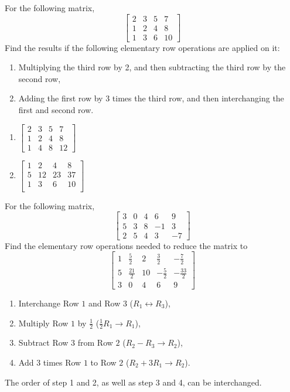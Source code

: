 \begin{Exercise}
For the following matrix,
\[
\begin{bmatrix}
2 & 3 & 5 & 7\\
1 & 2 & 4 & 8\\
1 & 3 & 6 & 10
\end{bmatrix}
\]
Find the results if the following elementary row operations are applied on it: 
\begin{enumerate}[label=(\alph*)]
\item Multiplying the third row by 2, and then subtracting the third row by the second row,
\item Adding the first row by 3 times the third row, and then interchanging the first and second row.\\
\end{enumerate}
\end{Exercise}
\begin{Answer}
\begin{enumerate}[label=(\alph*)]
\item $\begin{bmatrix}
2 & 3 & 5 & 7 \\
1 & 2 & 4 & 8 \\
1 & 4 & 8 & 12
\end{bmatrix}$
\item $\begin{bmatrix}
1 & 2 & 4 & 8 \\
5 & 12 & 23 & 37 \\
1 & 3 & 6 & 10\\
\end{bmatrix}$
\end{enumerate}
\end{Answer}

\begin{Exercise}
For the following matrix,
\[
\begin{bmatrix}
3 & 0 & 4 & 6 & 9\\
5 & 3 & 8 & -1 & 3 \\
2 & 5 & 4 & 3 & -7
\end{bmatrix}
\]
Find the elementary row operations needed to reduce the matrix to
\[
\begin{bmatrix}
1 & \frac{5}{2} & 2 & \frac{3}{2} & -\frac{7}{2} \\
5 & \frac{21}{2} & 10 & -\frac{5}{2} & -\frac{33}{2} \\
3 & 0 & 4 & 6 & 9
\end{bmatrix}
\]
\end{Exercise}
\begin{Answer}
\begin{enumerate}
\item Interchange Row $1$ and Row $3$ ($R_1 \leftrightarrow R_3$),
\item Multiply Row $1$ by $\frac{1}{2}$ ($\frac{1}{2}R_1 \rightarrow R_1$),
\item Subtract Row $3$ from Row $2$ ($R_2 - R_3 \rightarrow R_2$),
\item Add $3$ times Row $1$ to Row $2$ ($R_2 + 3R_1 \rightarrow R_2$).
\end{enumerate}
The order of step 1 and 2, as well as step 3 and 4, can be interchanged.
\end{Answer}

